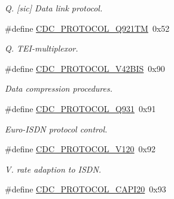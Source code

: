 \begin{DoxyCompactItemize}
\begin{DoxyCompactList}\small\item\em Q. \mbox{[}sic\mbox{]} Data link protocol. \end{DoxyCompactList}\item 
\hypertarget{group__cdc__protocol__group_ga4a1fc0e0435a322372f24b797bdccbc6}{\#define \hyperlink{group__cdc__protocol__group_ga4a1fc0e0435a322372f24b797bdccbc6}{C\-D\-C\-\_\-\-P\-R\-O\-T\-O\-C\-O\-L\-\_\-\-Q921\-T\-M}~0x52}\label{group__cdc__protocol__group_ga4a1fc0e0435a322372f24b797bdccbc6}

\begin{DoxyCompactList}\small\item\em Q. T\-E\-I-\/multiplexor. \end{DoxyCompactList}\item 
\hypertarget{group__cdc__protocol__group_ga230095dec563e53ab1231c981ee9d05f}{\#define \hyperlink{group__cdc__protocol__group_ga230095dec563e53ab1231c981ee9d05f}{C\-D\-C\-\_\-\-P\-R\-O\-T\-O\-C\-O\-L\-\_\-\-V42\-B\-I\-S}~0x90}\label{group__cdc__protocol__group_ga230095dec563e53ab1231c981ee9d05f}

\begin{DoxyCompactList}\small\item\em Data compression procedures. \end{DoxyCompactList}\item 
\hypertarget{group__cdc__protocol__group_ga0083ef9581e965b89b52d55bf315e419}{\#define \hyperlink{group__cdc__protocol__group_ga0083ef9581e965b89b52d55bf315e419}{C\-D\-C\-\_\-\-P\-R\-O\-T\-O\-C\-O\-L\-\_\-\-Q931}~0x91}\label{group__cdc__protocol__group_ga0083ef9581e965b89b52d55bf315e419}

\begin{DoxyCompactList}\small\item\em Euro-\/\-I\-S\-D\-N protocol control. \end{DoxyCompactList}\item 
\hypertarget{group__cdc__protocol__group_ga208090ddb75268f1f49e8e815400b6e3}{\#define \hyperlink{group__cdc__protocol__group_ga208090ddb75268f1f49e8e815400b6e3}{C\-D\-C\-\_\-\-P\-R\-O\-T\-O\-C\-O\-L\-\_\-\-V120}~0x92}\label{group__cdc__protocol__group_ga208090ddb75268f1f49e8e815400b6e3}

\begin{DoxyCompactList}\small\item\em V. rate adaption to I\-S\-D\-N. \end{DoxyCompactList}\item 
\hypertarget{group__cdc__protocol__group_ga4ae176ca7b4078cfc2506faff308d049}{\#define \hyperlink{group__cdc__protocol__group_ga4ae176ca7b4078cfc2506faff308d049}{C\-D\-C\-\_\-\-P\-R\-O\-T\-O\-C\-O\-L\-\_\-\-C\-A\-P\-I20}~0x93}\label{group__cdc__protocol__group_ga4ae176ca7b4078cfc2506faff308d049}


\end{DoxyCompactItemize}
